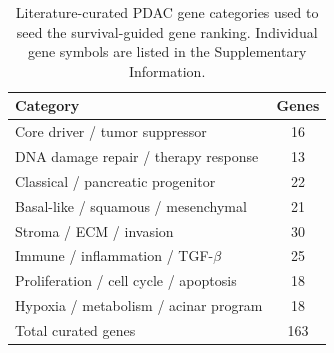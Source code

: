 \begin{table}[htbp]
  \centering
  \begin{tabular}{@{}l c@{}}
    \toprule
    \textbf{Category} & \textbf{Genes} \\
    \midrule
    Core driver / tumor suppressor            & 16 \\
    DNA damage repair / therapy response       & 13 \\
    Classical / pancreatic progenitor          & 22 \\
    Basal-like / squamous / mesenchymal        & 21 \\
    Stroma / ECM / invasion                    & 30 \\
    Immune / inflammation / TGF-$\beta$        & 25 \\
    Proliferation / cell cycle / apoptosis     & 18 \\
    Hypoxia / metabolism / acinar program      & 18 \\
    \midrule
    Total curated genes                        & 163 \\
    \bottomrule
  \end{tabular}
  \caption{Literature-curated PDAC gene categories used to seed the
    survival-guided gene ranking. Individual gene symbols are listed in the
    Supplementary Information.}
  \label{tab:gene-categories}
\end{table}
